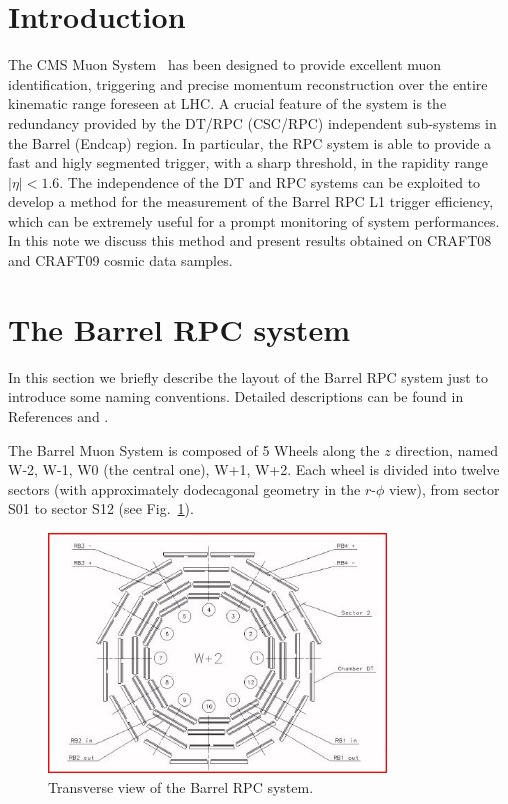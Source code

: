 \maketitle %

\section{Introduction}
The CMS Muon System~\cite{ref:mutdr}\cite{ref:jinst} has 
been designed to provide excellent muon
identification, triggering and precise momentum reconstruction 
over the entire kinematic range foreseen at LHC. A crucial
feature of the system is the redundancy provided by the DT/RPC 
(CSC/RPC) independent sub-systems in the Barrel (Endcap) region.
In particular, the RPC system is able to provide 
a fast and higly segmented trigger, with a 
sharp \pt threshold, in the rapidity range $|\eta| < 1.6$.
The independence of the DT and RPC systems can be exploited
to develop a method for the measurement of the Barrel RPC L1 
trigger efficiency, which can be extremely useful 
for a prompt monitoring of system performances.
In this note we discuss this method and present results
obtained on CRAFT08 and CRAFT09 cosmic data samples.

\section{The Barrel RPC system}
In this section we briefly describe the layout of the
Barrel RPC system just to introduce some
naming conventions. Detailed descriptions
can be found in References \cite{ref:mutdr}
and \cite{ref:jinst}.

The Barrel Muon System is composed of 5 Wheels along 
the $z$ direction, named W-2, W-1, W0 (the central one), 
W+1, W+2. Each wheel is divided into twelve 
sectors (with approximately dodecagonal geometry in the 
$r$-$\phi$ view), from sector S01 to sector S12 
(see Fig.~\ref{fig:barrel_lay}).

\begin{figure}[hbtp]
  \begin{center}
    \includegraphics[width=0.8\textwidth]{barrel_layout}
    \hspace{1cm}
    \caption{Transverse view of the Barrel RPC system.}
    \label{fig:barrel_lay}
  \end{center}
\end{figure}

